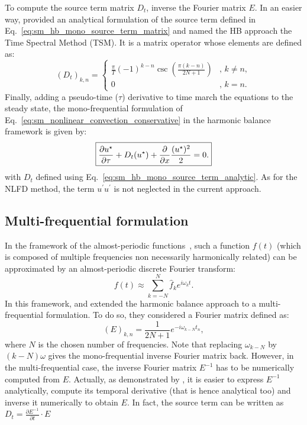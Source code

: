 To compute the source term matrix $D_t$, \citet{Hall2002}
inverse the Fourier matrix $E$.
In an easier way, \citet{Gopinath2005} provided 
an analytical formulation of the source term defined 
in Eq.~\eqref{eq:sm_hb_mono_source_term_matrix} and 
named the HB approach the Time Spectral Method (TSM).
It is a matrix operator whose elements are defined as:
\begin{equation}
  (D_t)_{k, n} =
  \begin{cases}
    \frac{\pi}{T}(-1)^{k-n}\csc\left(\frac{\pi
        (k-n)}{2N+1}\right) &, \, k\neq n,\\
    0 &, \, k=n.
  \end{cases}
  \label{eq:sm_hb_mono_source_term_analytic}
\end{equation}
Finally, adding a pseudo-time ($\tau$) derivative to 
time march the equations to the steady state, 
the mono-frequential formulation of 
Eq.~\eqref{eq:sm_nonlinear_convection_conservative} in the harmonic
balance framework is given by:
\begin{equation}
	\fbox{$
	\displaystyle \frac{\partial u^\star}{\partial \tau} + 
	D_t (u^\star) + 
	\displaystyle \frac{\partial}{\partial x}
		\frac{(u^\star)^2}{2} = 0.
	$}
\end{equation}
with $D_t$ defined using Eq.~\eqref{eq:sm_hb_mono_source_term_analytic}.
As for the NLFD method, the term $u^\prime u^\prime$
is not neglected in the current approach.

\subsection{Multi-frequential formulation}
\label{sec:sm_hb_multi}
In the
framework of the almost-periodic functions~\cite{Besicovitch1932},
such a function $f(t)$ (which is composed of multiple
frequencies non necessarily harmonically related) can be approximated
by an almost-periodic
discrete Fourier transform:
\begin{equation}
	f(t) \approx \sum_{k=-N}^{N} \widehat{f}_k 
	e^{i \omega_k t}.
\end{equation}
In this framework, \citet{Gopinath2007} and \citet{Ekici2007} 
extended the harmonic balance approach to
a multi-frequential formulation. To do so, they considered
a Fourier matrix defined as:
\begin{equation}
	(E)_{k,n} = \frac{1}{2N+1} e^{-i \omega_{k-N} t_n},
\end{equation}
where $N$ is the chosen number of frequencies.
Note that replacing $\omega_{k-N}$ by $(k - N) \omega$ gives
the mono-frequential inverse Fourier matrix back. 
However, in the multi-frequential case, the inverse Fourier matrix
$E^{-1}$ has to be numerically computed from $E$. Actually, as demonstrated by 
\citet{Gopinath2007}, it is easier to express $E^{-1}$ analytically,
compute its temporal derivative (that is hence analytical too) 
and inverse it numerically to obtain $E$. In fact, the source term
can be written as $D_t = \frac{\partial E^{-1}}{\partial t} \cdot E$

